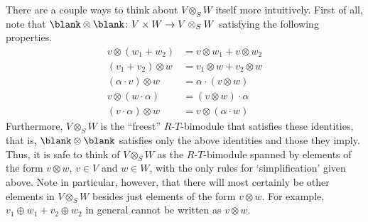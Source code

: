 There are a couple ways to think about $V\otimes _SW$ itself more intuitively.  First of all, note that $\blank \otimes \blank \colon V\times W\rightarrow V\otimes _SW$ satisfying the following properties.
\begin{subequations}
	\begin{align}
		v\otimes (w_1+w_2) & =v\otimes w_1+v\otimes w_2 \\
		(v_1+v_2)\otimes w & =v_1\otimes w+v_2\otimes w \\
		(\alpha \cdot v)\otimes w & =\alpha \cdot (v\otimes w) \\
		v\otimes (w\cdot \alpha ) & =(v\otimes w)\cdot \alpha \\
		(v\cdot \alpha )\otimes w & =v\otimes (\alpha \cdot w)\label{eqn5.3.5e}
	\end{align}
\end{subequations}
Furthermore, $V\otimes _SW$ is the ``freest'' $R$-$T$-bimodule that satisfies these identities, that is, $\blank \otimes \blank$ satisfies only the above identities and those they imply.  Thus, it is safe to think of $V\otimes _SW$ as the $R$-$T$-bimodule spanned by elements of the form $v\otimes w$, $v\in V$ and $w\in W$, with the only rules for `simplification' given above.  Note in particular, however, that there will most certainly be other elements in $V\otimes _SW$ besides just elements of the form $v\otimes w$.  For example, $v_1\oplus w_1+v_2\oplus w_2$ in general cannot be written as $v\otimes w$.

